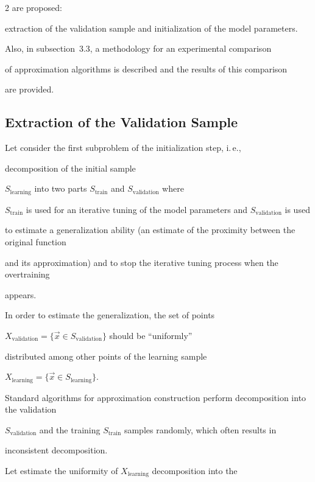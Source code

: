 \begin{multicols}{2}
are proposed:

extraction of the validation sample and initialization of the model parameters.

Also, in subsection~3.3,  a methodology for an experimental comparison 

of approximation algorithms is described and the results of this comparison

are provided.



\subsection{Extraction of the Validation Sample}

\label{divideSample}



\noindent

Let consider the first subproblem of the initialization step, i.\,e., 

decomposition of the initial sample 

$S_{\mathrm{learning}}$ into two parts $S_{\mathrm{train}}$ and $S_{\mathrm{validation}}$ where

$S_{\mathrm{train}}$ is used for an iterative tuning of the model parameters and $S_{\mathrm{validation}}$ is used 

to estimate a generalization ability (an estimate of the proximity between the original function 

and its approximation) and to stop the iterative tuning process when the overtraining 

appears.



In order to estimate the generalization, the set of points

$X_{\mathrm{validation}} = \{\vec x \in S_{\mathrm{validation}}\}$ should be ``uniformly'' 

distributed among other points of the learning sample 

$X_{\mathrm{learning}} = \{\vec x \in S_{\mathrm{learning}}\}$.

Standard algorithms for approximation construction perform decomposition into the validation

 $S_{\mathrm{validation}}$ and the training $S_{\mathrm{train}}$ samples randomly, which often results in 

 inconsistent decomposition.



Let estimate the uniformity of $X_{\mathrm{learning}}$ decomposition into the 


\end{multicols}
